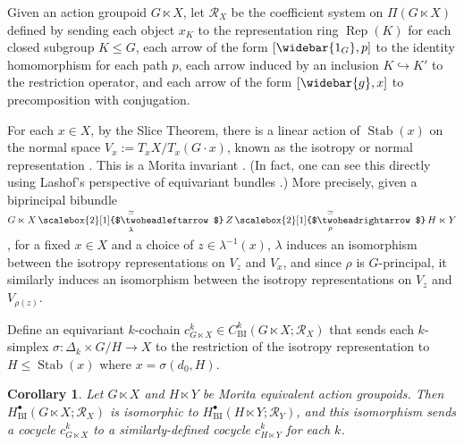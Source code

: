 \documentclass[12pt,reqno]{amsart}
\newcommand{\printname}[1]{}
\renewcommand{\printname}[1]
	{{\color{brown}{\makebox[0pt]{\hspace{-1in}\raisebox{8pt}{\tiny #1}}}}}
\newcommand{\labell}[1]{\label{#1} \printname{#1}}
\newcommand{\calR}{{\mathcal{R}}}
\newcommand{\Rep}{{\operatorname{Rep}}} %
\newcommand{\Stab}{{\operatorname{Stab}}} %
\newcommand{\ot}[1]{{\,\underset{\raisebox{1mm}{$\scriptstyle{#1}$}}{\overset{\simeq}{\scalebox{2}[1]{$\twoheadleftarrow$}}}\,}} %
\newcommand{\subdwe}{{\,\overset{\simeq}{\scalebox{2}[1]{$\twoheadrightarrow$}}\,}} %
\theoremstyle{plain}
\newtheorem{corollary}[theorem]{Corollary}
\theoremstyle{definition}
\newcommand{\BI}{{\operatorname{BI}}} %
\begin{document}
    Given an action groupoid $G\ltimes X$, let $\calR_X$ be the coefficient system on $\Pi(G\ltimes X)$ defined by sending each object $x_K$ to the representation ring $\Rep(K)$ for each closed subgroup $K\leq G$, each arrow of the form $[\widebar{1_G},p]$ to the identity homomorphism for each path $p$, each arrow induced by an inclusion $K\hookrightarrow K'$ to the restriction operator, and each arrow of the form $[\widebar{g},x]$ to precomposition with conjugation.  %

    For each $x\in X$, by the Slice Theorem, there is a linear action of $\Stab(x)$ on the normal space $V_x:=T_xX/T_x(G\cdot x)$, known as the isotropy or normal representation \cite[Theorems 2.3.3, 2.4.1]{DK}.  This is a Morita invariant \cite[Theorem 4.3.1]{dH:orbispaces}.  (In fact, one can see this directly using Lashof's perspective of equivariant bundles \cite{lashof}.)  More precisely, given a biprincipal bibundle $G\ltimes X\ot{\lambda}Z\underset{\raisebox{1mm}{$\scriptstyle\rho$}}{\subdwe} H\ltimes Y$, for a fixed $x\in X$ and a choice of $z\in\lambda^{-1}(x)$, $\lambda$ induces an isomorphism between the isotropy representations on $V_z$ and $V_x$, and since $\rho$ is $G$-principal, it similarly induces an isomorphism between the isotropy representations on $V_z$ and $V_{\rho(z)}$.

    Define an equivariant $k$-cochain $c^k_{G\ltimes X}\in C_\BI^k(G\ltimes X;\calR_X)$ that sends each $k$-simplex $\sigma\colon\Delta_k\times G/H\to X$ to the restriction of the isotropy representation to $H\leq\Stab(x)$ where $x=\sigma(d_0,H)$.

    \begin{corollary}\labell{c:rep coeff sys}
        Let $G\ltimes X$ and $H\ltimes Y$ be Morita equivalent action groupoids.  Then $H^\bullet_\BI(G\ltimes X;\calR_X)$ is isomorphic to $H^\bullet_\BI(H\ltimes Y;\calR_Y)$, and this isomorphism sends a cocycle $c^k_{G\ltimes X}$ to a similarly-defined cocycle $c^k_{H\ltimes Y}$ for each $k$.
    \end{corollary}
\end{document}
